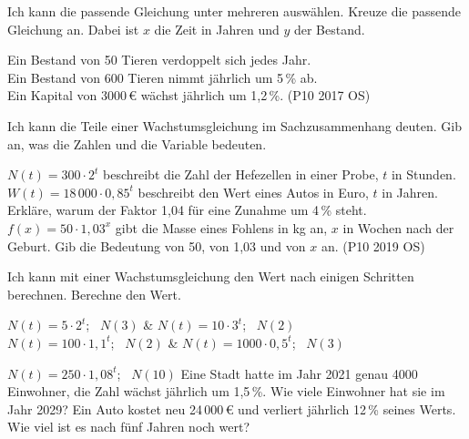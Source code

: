 \begin{aufgabe}{Ich kann die passende Gleichung unter mehreren auswählen.}
Kreuze die passende Gleichung an. Dabei ist $x$ die Zeit in Jahren und $y$ der Bestand.
\begin{teile}
\teil Ein Bestand von 50 Tieren verdoppelt sich jedes Jahr. \\ \quad{}\quad{}\quad{}
\teil Ein Bestand von 600 Tieren nimmt jährlich um 5\,\% ab. \\ \quad{}\quad{}\quad{}
\teil Ein Kapital von 3000\,€ wächst jährlich um 1,2\,\%. (P10 2017 OS) \\ \quad{}\quad{}\quad{}
\end{teile}
\end{aufgabe}

\begin{aufgabe}{Ich kann die Teile einer Wachstumsgleichung im Sachzusammenhang deuten.}
Gib an, was die Zahlen und die Variable bedeuten.
\begin{teile}
\teil $N(t) = 300 \cdot 2^t$ beschreibt die Zahl der Hefezellen in einer Probe, $t$ in Stunden.
\teil $W(t) = 18\,000 \cdot 0{,}85^t$ beschreibt den Wert eines Autos in Euro, $t$ in Jahren.
\teil Erkläre, warum der Faktor 1,04 für eine Zunahme um 4\,\% steht.
\teil $f(x) = 50 \cdot 1{,}03^x$ gibt die Masse eines Fohlens in kg an, $x$ in Wochen nach der Geburt. Gib die Bedeutung von 50, von 1,03 und von $x$ an. (P10 2019 OS)
\end{teile}
\end{aufgabe}


\begin{aufgabe}{Ich kann mit einer Wachstumsgleichung den Wert nach einigen Schritten berechnen.}
Berechne den Wert.
\begin{teilezwei}
\tz $N(t) = 5 \cdot 2^t$; \ $N(3)$ \leerfeld & \tz $N(t) = 10 \cdot 3^t$; \ $N(2)$ \leerfeld \\
\tz $N(t) = 100 \cdot 1{,}1^t$; \ $N(2)$ \leerfeld & \tz $N(t) = 1000 \cdot 0{,}5^t$; \ $N(3)$ \leerfeld \\
\end{teilezwei}
\begin{teile}
\teil $N(t) = 250 \cdot 1{,}08^t$; \ $N(10)$ \leerfeld
\teil Eine Stadt hatte im Jahr 2021 genau 4000 Einwohner, die Zahl wächst jährlich um 1,5\,\%. Wie viele Einwohner hat sie im Jahr 2029? \leerfeld
\teil Ein Auto kostet neu 24\,000\,€ und verliert jährlich 12\,\% seines Werts. Wie viel ist es nach fünf Jahren noch wert? \leerfeld[€]
\end{teile}
\end{aufgabe}

